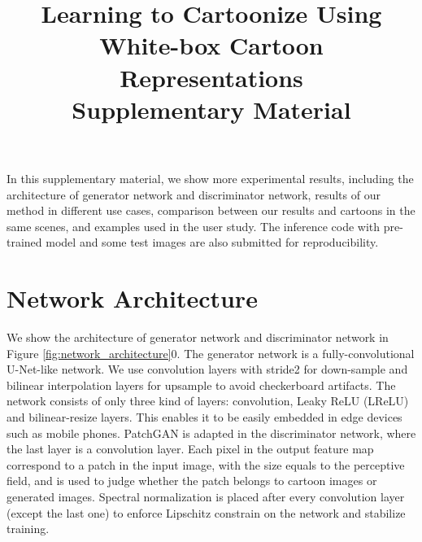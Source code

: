 \documentclass[10pt,twocolumn,letterpaper]{article}
\begin{document}



\title{Learning to Cartoonize Using White-box Cartoon Representations\\Supplementary Material}



In this supplementary material, we show more experimental results, including the architecture of generator network and discriminator network, results of our method in different use cases, comparison between our results and cartoons in the same scenes, and examples used in the user study. The inference code with pre-trained model and some test images are also submitted for reproducibility.

\vspace{-0.3em}
\section{Network Architecture}
\vspace{-0.3em}
We show the architecture of generator network and discriminator network in Figure \ref{fig:network_architecture}0. The generator network is a fully-convolutional U-Net-like \cite{ronneberger2015u} network. We use convolution layers with stride2 for down-sample and bilinear interpolation layers for upsample to avoid checkerboard artifacts. The network consists of only three kind of layers: convolution,  Leaky ReLU (LReLU) \cite{maas2013rectifier} and bilinear-resize layers. This enables it to be easily embedded in edge devices such as mobile phones. PatchGAN \cite{isola2017image} is adapted in the discriminator network, where the last layer is a convolution layer. Each pixel in the output feature map correspond to a patch in the input image, with the size equals to the perceptive field, and is used to judge whether the patch belongs to cartoon images or generated images. Spectral normalization \cite{miyato2018spectral} is placed after every convolution layer (except the last one) to enforce Lipschitz constrain on the network and stabilize training.
\end{document}
